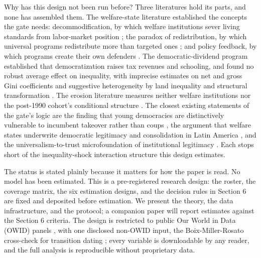 \documentclass[11pt,letterpaper]{article}
\begin{document}
Why has this design not been run before? Three literatures hold its parts, and none has assembled them. The welfare-state literature established the concepts the gate needs: decommodification, by which welfare institutions sever living standards from labor-market position \citep{EspingAndersen1990}; the paradox of redistribution, by which universal programs redistribute more than targeted ones \citep{KorpiPalme1998}; and policy feedback, by which programs create their own defenders \citep{Pierson1993, SossSchram2007}. The democratic-dividend program established that democratization raises tax revenues and schooling, and found no robust average effect on inequality, with imprecise estimates on net and gross Gini coefficients and suggestive heterogeneity by land inequality and structural transformation \citep{AcemogluNaidu2015}. The erosion literature measures neither welfare institutions nor the post-1990 cohort's conditional structure \citep{RauStokes2025, HaggardKaufman2021}. The closest existing statements of the gate's logic are the finding that young democracies are distinctively vulnerable to incumbent takeover rather than coups \citep{Svolik2015}, the argument that welfare states underwrite democratic legitimacy and consolidation in Latin America \citep{HuberStephens2001, HuberStephens2012}, and the universalism-to-trust microfoundation of institutional legitimacy \citep{RothsteinUslaner2005}. Each stops short of the inequality-shock interaction structure this design estimates.

The status is stated plainly because it matters for how the paper is read. No model has been estimated. This is a pre-registered research design: the roster, the coverage matrix, the six estimation designs, and the decision rules in Section 6 are fixed and deposited before estimation. We present the theory, the data infrastructure, and the protocol; a companion paper will report estimates against the Section 6 criteria. The design is restricted to public Our World in Data (OWID) panels \citep{OurWorldInData2025}, with one disclosed non-OWID input, the Boix-Miller-Rosato cross-check for transition dating \citep{BoixMiller2013}; every variable is downloadable by any reader, and the full analysis is reproducible without proprietary data.
\end{document}
